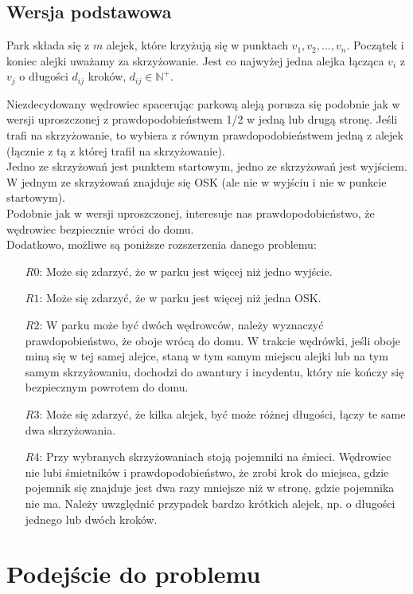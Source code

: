 \documentclass[titlepage]{article}
\begin{document}
\subsection{Wersja podstawowa}
Park składa się z $m$ alejek, które krzyżują się w punktach $v_1, v_2, ..., v_n$. Początek i koniec alejki uważamy za skrzyżowanie. Jest co najwyżej jedna alejka łącząca $v_i$ z $v_j$ o długości $d_{ij}$ kroków, $d_{ij} \in \mathbb{N}^+$.
\par Niezdecydowany wędrowiec spacerując parkową aleją porusza się podobnie jak w wersji uproszczonej z prawdopodobieństwem 1/2 w jedną lub drugą stronę. Jeśli trafi na skrzyżowanie, to wybiera z równym prawdopodobieństwem jedną z alejek (łącznie z tą z której trafił na skrzyżowanie).\\
Jedno ze skrzyżowań jest punktem startowym, jedno ze skrzyżowań jest wyjściem.\\ W jednym ze skrzyżowań znajduje się OSK (ale nie w wyjściu i nie w punkcie startowym).\\
Podobnie jak w wersji uproszczonej, interesuje nas prawdopodobieństwo, że wędrowiec bezpiecznie wróci do domu.\\
Dodatkowo, możliwe są poniższe rozszerzenia danego problemu:
\begin{itemize}
\item[$R0$:]Może się zdarzyć, że w parku jest więcej niż jedno wyjście.
\item[$R1$:]Może się zdarzyć, że w parku jest więcej niż jedna OSK.
\item[$R2$:]W parku może być dwóch wędrowców, należy wyznaczyć prawdopobieństwo, że oboje wrócą do domu. W trakcie wędrówki, jeśli oboje miną się w tej samej alejce, staną w tym samym miejscu alejki lub na tym samym skrzyżowaniu, dochodzi do awantury i incydentu, który nie kończy się bezpiecznym powrotem do domu.
\item[$R3$:]Może się zdarzyć, że kilka alejek, być może różnej długości, łączy te same dwa skrzyżowania.
\item[$R4$:]Przy wybranych skrzyżowaniach stoją pojemniki na śmieci. Wędrowiec nie lubi
śmietników i prawdopodobieństwo, że zrobi krok do miejsca, gdzie pojemnik się znajduje jest dwa razy mniejsze niż w stronę, gdzie pojemnika nie ma. Należy uwzględnić przypadek bardzo krótkich alejek, np. o długości jednego lub dwóch kroków.
\end{itemize}

\newpage
\section{Podejście do problemu}
\end{document}
